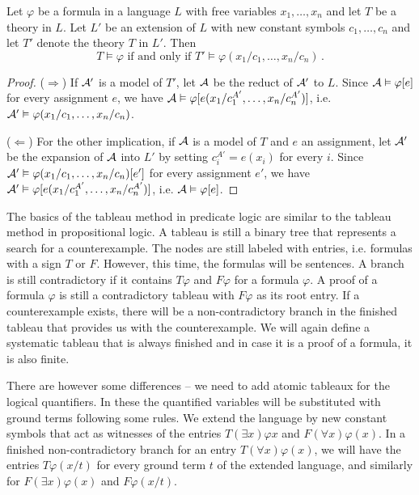 \begin{theorem}
Let $\varphi$ be a formula in a language $L$ with free variables $x_1, \dots, x_n$ and let $T$ be a theory in $L$. Let $L'$ be an extension of $L$ with new constant symbols $c_1, \dots, c_n$ and let $T'$ denote the theory $T$ in $L'$. Then $$T \vDash \varphi \text{ if and only if } T'\vDash \varphi(x_1/c_1, \dots, x_n/c_n)\,.$$
\end{theorem}
\begin{proof}
($\Rightarrow$) If $\mathcal{A}'$ is a model of $T'$, let $\mathcal{A}$ be the reduct of $\mathcal{A}'$ to $L$. Since $\mathcal{A} \vDash \varphi[e]$ for every assignment $e$, we have $\mathcal{A} \vDash \varphi[e(x_1/c_1^{A'}, \dots, x_n/c_n^{A'})]$, i.e. $\mathcal{A}' \vDash \varphi(x_1/c_1, \dots, x_n/c_n)$.

($\Leftarrow$) For the other implication, if $\mathcal{A}$ is a model of $T$ and $e$ an assignment, let $\mathcal{A}'$ be the expansion of $\mathcal{A}$ into $L'$ by setting $c_i^{A'} = e(x_i)$ for every $i$. Since $\mathcal{A}' \vDash \varphi(x_1/c_1, \dots, x_n/c_n)[e']$ for every assignment $e'$, we have $\mathcal{A}' \vDash \varphi[e(x_1/c_1^{A'}, \dots, x_n/c_n^{A'})]$, i.e. $\mathcal{A} \vDash \varphi[e]$.
\end{proof}

The basics of the tableau method in predicate logic are similar to the tableau method in propositional logic. A tableau is still a binary tree that represents a search for a counterexample. The nodes are still labeled with entries, i.e. formulas with a sign $T$ or $F$. However, this time, the formulas will be sentences. A branch is still contradictory if it contains $T \varphi$ and $F \varphi$ for a formula $\varphi$. A proof of a formula $\varphi$ is still a contradictory tableau with $F \varphi$ as its root entry. If a counterexample exists, there will be a non-contradictory branch in the finished tableau that provides us with the counterexample. We will again define a systematic tableau that is always finished and in case it is a proof of a formula, it is also finite. 

There are however some differences -- we need to add atomic tableaux for the logical quantifiers. In these the quantified variables will be substituted with ground terms following some rules. We extend the language by new constant symbols that act as witnesses of the entries $T(\exists x) \varphi x$ and $F(\forall x) \varphi(x)$. In a finished non-contradictory branch for an entry $T (\forall x) \varphi(x)$, we will have the entries $T \varphi(x/t)$ for every ground term $t$ of the extended language, and similarly for $F (\exists x) \varphi(x)$ and $F \varphi(x/t)$.

